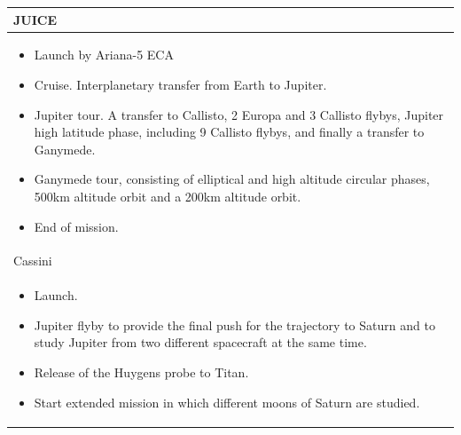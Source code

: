\begin{longtable}{p{}}
  JUICE \\* \midrule

  \begin{itemize}
  \item Launch by Ariana-5 ECA
  \item Cruise. Interplanetary transfer from Earth to Jupiter.
  \item Jupiter tour. A transfer to Callisto, 2 Europa and 3 Callisto
    flybys, Jupiter high latitude phase, including 9 Callisto flybys,
    and finally a transfer to Ganymede.
  \item Ganymede tour, consisting of elliptical and high altitude
    circular phases, 500km altitude orbit and a 200km altitude orbit.
  \item End of mission.
  \end{itemize} \\

  Cassini \\* \midrule

  \begin{itemize}
  \item Launch.
  \item Jupiter flyby to provide the final push for the trajectory to
    Saturn and to study Jupiter from two different spacecraft at the
    same time.
  \item Release of the Huygens probe to Titan.
  \item Start extended mission in which different moons of Saturn are
    studied.
  \end{itemize} \\ \bottomrule
\end{longtable}

